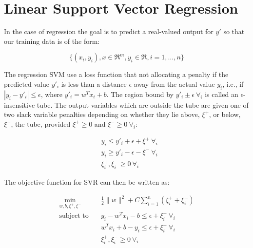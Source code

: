 \section{Linear Support Vector Regression}

In the case of regression the goal is to predict a real-valued output for $y'$ so that our training data is of the form:

\begin{equation}
	\{(x_i,y_i), x\in\Re^m, y_i\in\Re, i=1, \dots, n\} \label{eq:svr_data}
\end{equation}

The regression SVM use a loss function that not allocating a penalty if the predicted value $y'_i$ is less than a distance $\epsilon$ away from the actual value $y_i$, i.e., if $|y_i-y'_i| \leq \epsilon$, where $y'_i = w^T x_i + b$. The region bound by $y'_i\pm\epsilon \ \forall_i$ is called an $\epsilon$-insensitive tube. The output variables which are outside the tube are given one of two slack variable penalties depending on whether they lie above, $\xi^+$, or below, $\xi^-$, the tube, provided $\xi^+ \geq 0$ and $\xi^- \geq 0 \ \forall_i$:

\begin{equation} \label{eq:svr_consts}
	\begin{aligned}
		& y_i\leq y'_i+\epsilon+\xi^+ \ \forall_i \\
    	& y_i\geq y'_i-\epsilon-\xi^- \ \forall_i \\
    	& \xi_i^+, \xi_i^- \geq 0 \ \forall_i
	\end{aligned}
\end{equation}

The objective function for SVR can then be written as:

\begin{equation} \label{eq:quad_svr_obj}
    \begin{aligned}
        \min_{w,b,\xi^+,\xi^-} \quad & \frac{1}{2} \| w \|^2 + C \sum_{i=1}^n (\xi_i^+ + \xi_i^-) \\
            \text{subject to} \quad & y_i - w^T x_i - b \leq \epsilon + \xi_i^+ \ \forall_i \\ & w^T x_i + b - y_i \leq \epsilon + \xi_i^- \ \forall_i \\ & \xi_i^+, \xi_i^- \geq 0 \ \forall_i
    \end{aligned}
\end{equation}


